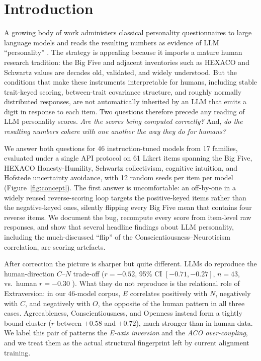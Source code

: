 \documentclass[11pt]{article}
\begin{document}
\section{Introduction}
\label{sec:intro}

A growing body of work administers classical personality questionnaires to large language models and reads the resulting numbers as evidence of LLM ``personality'' \citep{jiang2023personality, pan2024personality, serapio-garcia2025personality}.
The strategy is appealing because it imports a mature human research tradition: the Big Five and adjacent inventories such as HEXACO and Schwartz values are decades old, validated, and widely understood.
But the conditions that make these instruments interpretable for humans, including stable trait-keyed scoring, between-trait covariance structure, and roughly normally distributed responses, are not automatically inherited by an LLM that emits a digit in response to each item.
Two questions therefore precede any reading of LLM personality scores.
\emph{Are the scores being computed correctly?}
And, \emph{do the resulting numbers cohere with one another the way they do for humans?}

We answer both questions for 46 instruction-tuned models from 17 families, evaluated under a single API protocol on 61 Likert items spanning the Big Five, HEXACO Honesty-Humility, Schwartz collectivism, cognitive intuition, and Hofstede uncertainty avoidance, with 12 random seeds per item per model (Figure~\ref{fig:concept}).
The first answer is uncomfortable: an off-by-one in a widely reused reverse-scoring loop targets the positive-keyed items rather than the negative-keyed ones, silently flipping every Big Five mean that contains four reverse items.
We document the bug, recompute every score from item-level raw responses, and show that several headline findings about LLM personality, including the much-discussed ``flip'' of the Conscientiousness--Neuroticism correlation, are scoring artefacts.

After correction the picture is sharper but quite different.
LLMs do reproduce the human-direction $C$--$N$ trade-off ($r = -0.52$, 95\% CI $[-0.71, -0.27]$, $n = 43$, vs.\ human $r = -0.30$ \citep{soto2017bfi2}).
What they do not reproduce is the relational role of Extraversion: in our 46-model corpus, $E$ correlates positively with $N$, negatively with $C$, and negatively with $O$, the opposite of the human pattern in all three cases.
Agreeableness, Conscientiousness, and Openness instead form a tightly bound cluster ($r$ between $+0.58$ and $+0.72$), much stronger than in human data.
We label this pair of patterns the \emph{E-axis inversion} and the \emph{ACO over-coupling}, and we treat them as the actual structural fingerprint left by current alignment training.
\end{document}
